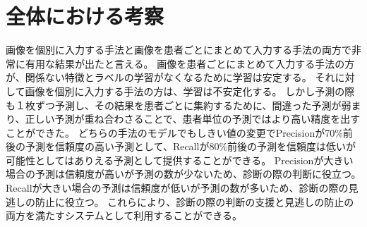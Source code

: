 \section{全体における考察}
画像を個別に入力する手法と画像を患者ごとにまとめて入力する手法の両方で非常に有用な結果が出たと言える。
画像を患者ごとにまとめて入力する手法の方が、関係ない特徴とラベルの学習がなくなるために学習は安定する。
それに対して画像を個別に入力する手法の方は、学習は不安定化する。
しかし予測の際も１枚ずつ予測し、その結果を患者ごとに集約するために、間違った予測が弱まり、正しい予測が重ね合わさることで、患者単位の予測ではより高い精度を出すことができた。
どちらの手法のモデルでもしきい値の変更でPrecisionが70\%前後の予測を信頼度の高い予測として、Recallが80\%前後の予測を信頼度は低いが可能性としてはありえる予測として提供することができる。
Precisionが大きい場合の予測は信頼度が高いが予測の数が少ないため、診断の際の判断に役立つ。
Recallが大きい場合の予測は信頼度が低いが予測の数が多いため、診断の際の見逃しの防止に役立つ。
これらにより、診断の際の判断の支援と見逃しの防止の両方を満たすシステムとして利用することができる。
